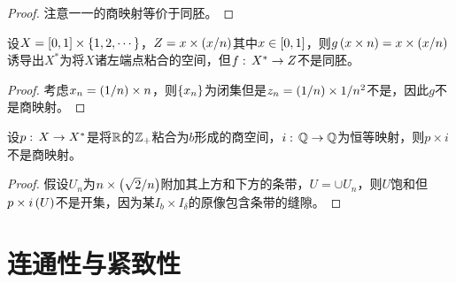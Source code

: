 \documentclass{ctexrep}
\begin{document}
  \begin{proof}
    注意一一的商映射等价于同胚。
  \end{proof}
  \begin{ex}
    设$X=\left[0,1\right]\times\left\{1,2,\cdots\right\}$，$Z=x\times \left(x/n\right)$其中$x\in\left[0,1\right]$，则$g\left(x\times n\right) = x\times\left(x/n\right)$诱导出$X^*$为将$X$诸左端点粘合的空间，但$f:\, X^* \rightarrow Z$不是同胚。
  \end{ex}
  \begin{proof}
    考虑$x_n=\left(1/n\right)\times n$，则$\left\{x_n\right\}$为闭集但是$z_n=\left(1/n\right)\times{1/n^2}$不是，因此$g$不是商映射。
  \end{proof}
  \begin{ex}
    设$p:\, X \rightarrow X^*$是将$\mathbb{R}$的$\mathbb{Z}_+$粘合为$b$形成的商空间，$i:\, \mathbb{Q} \rightarrow \mathbb{Q}$为恒等映射，则$p\times i$不是商映射。
  \end{ex}
  \begin{proof}
    假设$U_n$为$n\times\left(\sqrt{2}/n\right)$附加其上方和下方的条带，$U=\cup U_n$，则$U$饱和但$p\times i\left(U\right)$不是开集，因为某$I_b\times I_\delta$的原像包含条带的缝隙。
  \end{proof}
  \section{连通性与紧致性}
\end{document}
